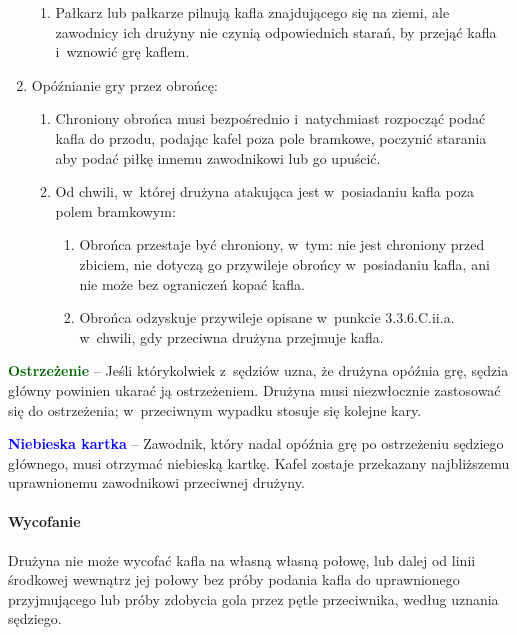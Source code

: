 \documentclass[12pt]{article}
\newcommand\bluecard[1]{\bgroup\textcolor{blue}{\textbf{#1}}}
\newcommand\other[1]{\bgroup\textcolor{darkgreen}{\textbf{#1}}}
\begin{document}
\begin{enumerate}
\begin{enumerate}
		      \item Pałkarz lub pałkarze pilnują kafla znajdującego się na ziemi, ale
		            zawodnicy ich drużyny nie czynią odpowiednich starań, by przejąć kafla i~wznowić grę kaflem.
	      \end{enumerate}

	\item Opóźnianie gry przez obrońcę:
	      \begin{enumerate}
		      \item Chroniony obrońca musi bezpośrednio i~natychmiast rozpocząć podać
		            kafla do przodu, podając kafel poza pole bramkowe, poczynić starania aby
		            podać piłkę innemu zawodnikowi lub go upuścić.

		      \item Od chwili, w~której drużyna atakująca jest w~posiadaniu kafla poza
		            polem bramkowym:
		            \begin{enumerate}
			            \item Obrońca przestaje być chroniony, w~tym: nie jest chroniony przed
			                  zbiciem, nie dotyczą go przywileje obrońcy w~posiadaniu kafla, ani nie
			                  może bez ograniczeń kopać kafla.

			            \item Obrońca odzyskuje przywileje opisane w~punkcie 3.3.6.C.ii.a.
			                  w~chwili, gdy przeciwna drużyna przejmuje kafla.
		            \end{enumerate}
	      \end{enumerate}
\end{enumerate}

\other{Ostrzeżenie} -- Jeśli którykolwiek z~sędziów uzna, że drużyna
opóźnia grę, sędzia główny powinien ukarać ją ostrzeżeniem. Drużyna musi
niezwłocznie zastosować się do ostrzeżenia; w~przeciwnym wypadku stosuje
się kolejne kary.

\bluecard{Niebieska kartka} -- Zawodnik, który nadal opóźnia grę po
ostrzeżeniu sędziego głównego, musi otrzymać niebieską kartkę. Kafel
zostaje przekazany najbliższemu uprawnionemu zawodnikowi przeciwnej
drużyny.

\paragraph{Wycofanie}
Drużyna nie może wycofać kafla na własną
własną połowę, lub dalej od linii środkowej wewnątrz jej połowy bez
próby podania kafla do uprawnionego przyjmującego lub próby zdobycia
gola przez pętle przeciwnika, według uznania sędziego.
\end{document}
